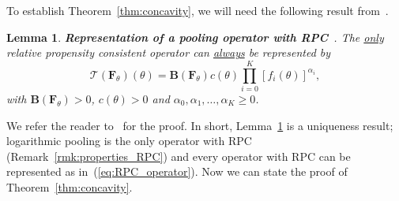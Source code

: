 \documentclass[12pt]{article}
\newtheorem{lemma}{Lemma}[]
\begin{document}
To establish Theorem~\ref{thm:concavity}, we will need the following result from~\textcite{Genest1984}.
\begin{lemma}
\label{lem:RPC_representation}
\textbf{Representation of a pooling operator with RPC}~\parencite[eq. 3.1]{Genest1984}.
The \underline{only} relative propensity consistent operator can \underline{always} be represented by
\begin{equation}
 \label{eq:RPC_operator}
 \mathcal{T} \left( \boldsymbol F_\theta \right)(\theta) = \boldsymbol B\left( \boldsymbol F_\theta \right) c(\theta) \prod_{i=0}^K \left[f_i(\theta) \right]^{\alpha_i},
\end{equation}
with $\boldsymbol B\left( \boldsymbol F_\theta \right) > 0$, $c(\theta) >0$  and $\alpha_0, \alpha_1, \ldots, \alpha_K \geq 0$. 
\end{lemma}
We refer the reader to~\textcite{Genest1984} for the proof.
In short, Lemma~\ref{lem:RPC_representation} is a uniqueness result; logarithmic pooling is the only operator with RPC (Remark~\ref{rmk:properties_RPC}) and every operator with RPC can be represented as in~(\ref{eq:RPC_operator}). 
Now we can state the proof of Theorem~\ref{thm:concavity}.
\end{document}

